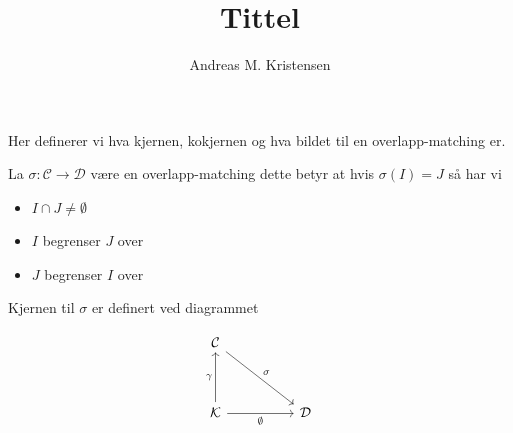 \documentclass{article}
\title{Tittel}
\author{Andreas M. Kristensen}
\newcommand{\es}{\emptyset}
\newcommand{\Dcal}{\mathcal{D}}
\newcommand{\Ccal}{\mathcal{C}}
\newcommand{\Kcal}{\mathcal{K}}
\begin{document}
\maketitle
Her definerer vi hva kjernen, kokjernen og hva bildet til en overlapp-matching er.

La $\sigma:\Ccal\to\Dcal$ være en overlapp-matching dette betyr at hvis $\sigma(I)=J$ så har vi

\begin{itemize}
  \item $I\cap J\neq\es$
  \item $I$ begrenser $J$ over
  \item $J$ begrenser $I$ over
\end{itemize}

Kjernen til $\sigma$ er definert ved diagrammet

\[\begin{tikzcd}
	\Ccal \\
	\\
	\Kcal && \Dcal
	\arrow["\sigma", from=1-1, to=3-3]
	\arrow["\gamma", from=3-1, to=1-1]
	\arrow["\es"', from=3-1, to=3-3]
\end{tikzcd}\]
\end{document}
